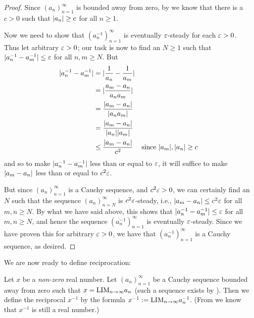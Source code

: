 \begin{proof}
Since \((a_n)_{n = 1}^{\infty}\) is bounded away from zero, by  we know that there is a \(c > 0\) such that \(\lvert a_n\rvert \ge c\) for all \(n \ge 1\).

Now we need to show that \((a_n^{-1})_{n = 1}^{\infty}\) is eventually \(\varepsilon\)-steady for each \(\varepsilon > 0\).
Thus let arbitrary \(\varepsilon > 0\);
our task is now to find an \(N \ge 1\) such that \(\lvert a_n^{-1} - a_m^{-1}\rvert \le \varepsilon\) for all \(n, m \ge N\).
But
\begin{align*}
    \lvert a_n^{-1} - a_m^{-1}\rvert & = \lvert\frac1{a_n} - \frac1{a_m}\rvert \\
                              & = \lvert\frac{a_m - a_n}{a_n a_m}\rvert \\
                              & = \frac{\lvert a_m - a_n\rvert}{\lvert a_n a_m\rvert} \\
                              & = \frac{\lvert a_m - a_n\rvert}{\lvert a_n\rvert\lvert a_m\rvert} \\
                              & \le \frac{\lvert a_m - a_n\rvert}{c^2} & \text{since \(\lvert a_m\rvert, \lvert a_n\rvert \ge c\)}
\end{align*}
and so to make \(\lvert a_n^{-1} - a_m^{-1}\rvert\) less than or equal to
\(\varepsilon\), it will suffice to make \(\lvert a_m - a_n\rvert\) less than or equal to \(c^2\varepsilon\).

But since \((a_n)_{n = 1}^{\infty}\) is a Cauchy sequence, and \(c^2\varepsilon > 0\), we can certainly find an \(N\) such that the sequence \((a_n)_{n = N}^{\infty}\) is \(c^2\varepsilon\)-steady, 
i.e., \(\lvert a_m - a_n\rvert \le c^2\varepsilon\) for all \(m, n \ge N\).
By what we have said above, this shows that \(\lvert a_n^{-1} - a_m^{-1}\rvert \le \varepsilon\) for all \(m, n \ge N\), and hence the sequence \((a_n^{-1})_{n = 1}^{\infty}\) is eventually \(\varepsilon\)-steady.
Since we have proven this for arbitrary \(\varepsilon > 0\), we have that \((a_n^{-1})_{n = 1}^{\infty}\) is a Cauchy sequence, as desired.
\end{proof}

We are now ready to define reciprocation:
\begin{definition}  \label{def 5.3.16}
Let \(x\) be a \emph{non-zero} real number.
Let \((a_n)_{n = 1}^{\infty}\) be a Cauchy sequence bounded away from zero such that \(x = \text{LIM}_{n \to \infty} a_n\)
(such a sequence exists by ).
Then we define the reciprocal \(x^{-1}\) by the formula \(x^{-1} := \text{LIM}_{n \to \infty} a_n^{-1}\).
(From  we know that \(x^{-1}\) is still a real number.)
\end{definition}

